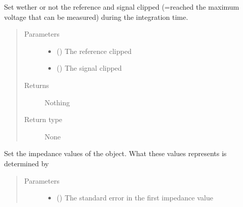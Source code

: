 \documentclass[letterpaper,10pt,english]{sphinxmanual}
\begin{document}
\begin{fulllineitems}
\begin{fulllineitems}
\label{\detokenize{index:impedance.impedance.set_clipping}}
\sphinxAtStartPar
Set wether or not the reference and signal clipped (=reached the maximum voltage that can be measured) during the integration time.
\begin{quote}\begin{description}
\item[{Parameters}] \leavevmode\begin{itemize}
\item {} 
\sphinxAtStartPar
{} () \textendash{} The reference clipped

\item {} 
\sphinxAtStartPar
{} () \textendash{} The signal clipped

\end{itemize}

\item[{Returns}] \leavevmode
\sphinxAtStartPar
Nothing

\item[{Return type}] \leavevmode
\sphinxAtStartPar
None

\end{description}\end{quote}

\end{fulllineitems}


\begin{fulllineitems}
\label{\detokenize{index:impedance.impedance.set_errors}}
\sphinxAtStartPar
Set the impedance values of the object. What these values represents is determined by 
\begin{quote}\begin{description}
\item[{Parameters}] \leavevmode\begin{itemize}
\item {} 
\sphinxAtStartPar
{} () \textendash{} The standard error in the first impedance value


\end{itemize}
\end{description}
\end{quote}
\end{fulllineitems}
\end{fulllineitems}
\end{document}
